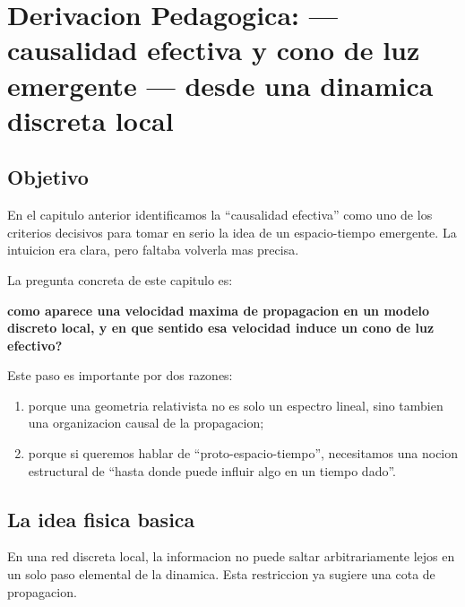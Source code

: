\chapter{Derivacion Pedagogica: --- causalidad efectiva y cono de luz emergente --- desde una dinamica discreta local}
\label{ch:causalidad-cono-luz}







\section{Objetivo}
En el capitulo anterior identificamos la \enquote{causalidad efectiva} como uno de los criterios decisivos para tomar en serio la idea de un espacio-tiempo emergente. La intuicion era clara, pero faltaba volverla mas precisa.

La pregunta concreta de este capitulo es:
\begin{displayquote}
\textbf{como aparece una velocidad maxima de propagacion en un modelo discreto local, y en que sentido esa velocidad induce un cono de luz efectivo?}
\end{displayquote}

Este paso es importante por dos razones:
\begin{enumerate}[label=\arabic*.]
    \item porque una geometria relativista no es solo un espectro lineal, sino tambien una organizacion causal de la propagacion;
    \item porque si queremos hablar de \enquote{proto-espacio-tiempo}, necesitamos una nocion estructural de \enquote{hasta donde puede influir algo en un tiempo dado}.
\end{enumerate}

\section{La idea fisica basica}
En una red discreta local, la informacion no puede saltar arbitrariamente lejos en un solo paso elemental de la dinamica. Esta restriccion ya sugiere una cota de propagacion.


